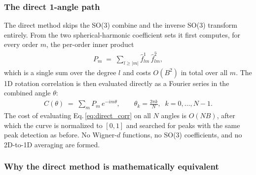 \subsubsection{The direct 1-angle path}
\label{sec:direct_directpath}

The direct method skips the SO(3) combine and the inverse SO(3) transform
entirely. From the two spherical-harmonic coefficient sets it first computes, for
every order $m$, the per-order inner product
\begin{align}
    P_{m} \;=\; \sum_{l\geq |m|} \hat{f}^{1}_{lm}\,
               \overline{\hat{f}^{2}_{lm}},
    \label{eq:Pm}
\end{align}
which is a single sum over the degree $l$ and costs $O(B^{2})$ in total over all
$m$. The 1D rotation correlation is then evaluated directly as a Fourier series
in the combined angle $\theta$:
\begin{align}
    C(\theta) \;=\; \sum_{m} P_{m}\,e^{-im\theta},
    \qquad \theta_{k}=\frac{2\pi k}{N},\;\; k=0,\dots,N-1.
    \label{eq:direct_corr}
\end{align}
The cost of evaluating Eq.\,\ref{eq:direct_corr} on all $N$ angles is $O(NB)$,
after which the curve is normalized to $[0,1]$ and searched for peaks with the
same peak detection as before. No Wigner-$d$ functions, no SO(3) coefficients,
and no 2D-to-1D averaging are formed.

\subsubsection{Why the direct method is mathematically equivalent}
\label{sec:direct_equivalence}

